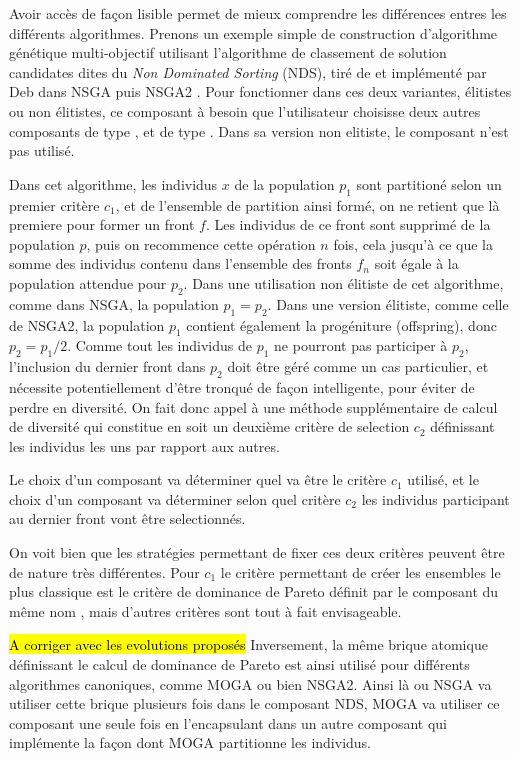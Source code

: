 Avoir accès de façon lisible permet de mieux comprendre les différences entres les différents algorithmes. Prenons un exemple simple de construction d'algorithme génétique multi-objectif utilisant l'algorithme de classement de solution candidates dites du \textit{Non Dominated Sorting} (NDS), tiré de \autocite{Goldberg1989} et implémenté par Deb dans NSGA \autocite{Deb1994} puis NSGA2 \autocite{Deb2001}. Pour fonctionner dans ces deux variantes, élitistes ou non élitistes, ce composant à besoin que l'utilisateur choisisse deux autres composants de type , et de type . Dans sa version non elitiste, le composant  n'est pas utilisé.

Dans cet algorithme, les individus $x$ de la population $p_1$ sont partitioné selon un premier critère $c_1$, et de l'ensemble de partition ainsi formé, on ne retient que là premiere pour former un front $f$. Les individus de ce front sont supprimé de la population $p$, puis on recommence cette opération $n$ fois, cela jusqu'à ce que la somme des individus contenu dans l'ensemble des fronts $f_n$ soit égale à la population attendue pour $p_2$. Dans une utilisation non élitiste de cet algorithme, comme dans NSGA, la population $p_1 = p_2$. Dans une version élitiste, comme celle de NSGA2, la population $p_1$ contient également la progéniture (offspring), donc $p_2 = p_1 / 2$. Comme tout les individus de $p_1$ ne pourront pas participer à $p_2$, l'inclusion du dernier front dans $p_2$ doit être géré comme un cas particulier, et nécessite potentiellement d'être tronqué de façon intelligente, pour éviter de perdre en diversité. On fait donc appel à une méthode supplémentaire de calcul de diversité qui constitue en soit un deuxième critère de selection $c_2$ définissant les individus les uns par rapport aux autres.

Le choix d'un composant  va déterminer quel va être le critère $c_1$ utilisé, et le choix d'un composant  va déterminer selon quel critère $c_2$ les individus participant au dernier front vont être selectionnés.

On voit bien que les stratégies permettant de fixer ces deux critères peuvent être de nature très différentes. Pour $c_1$ le critère permettant de créer les ensembles le plus classique est le critère de dominance de Pareto définit par le composant du même nom , mais d'autres critères sont tout à fait envisageable.

\hl{ A corriger avec les evolutions proposés}
Inversement, la même brique atomique définissant le calcul de dominance de Pareto est ainsi utilisé pour différents algorithmes canoniques, comme MOGA ou bien NSGA2. Ainsi là ou NSGA va utiliser cette brique plusieurs fois dans le composant NDS, MOGA va utiliser ce composant une seule fois en l'encapsulant dans un autre composant qui implémente la façon dont MOGA partitionne les individus.


